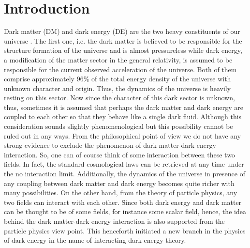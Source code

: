 \documentclass[superscriptaddress,oneolumn,secnumarabic,
amssymb,amsmath,nobibnotes,aps,prd,showpacs,nofootinbib]{revtex4}%
\begin{document}
\maketitle

\section{Introduction}



Dark matter (DM) and dark energy (DE) are the two heavy constituents of our universe \cite{Ade:2015xua}. The first one, i.e. the dark matter is believed to be responsible for the structure formation of the universe and is almost pressureless while dark energy, a modification of the matter sector in the general relativity, is assumed to be responsible for the current observed acceleration of the universe. Both of them comprise approximately 96\% of the total energy density of the universe with unknown character and origin. Thus, the dynamics of the universe is heavily resting on this sector. Now since the character of this dark sector is unknown, thus, sometimes it is assumed that perhaps the dark matter and dark energy are coupled to each other so that they behave like a single dark fluid. Although this consideration sounds slightly phenomenological but this possibility cannot be ruled out in any ways. From the philosophical point of view we do not have any strong evidence to exclude the phenomenon of dark matter-dark energy interaction. So, one can of course think of some interaction between these two fields. In fact, the standard cosmological laws can be retrieved  at any time under the no interaction limit. Additionally, the dynamics of the universe in presence of any coupling between dark matter and dark energy becomes quite richer with many possibilities. On the other hand, from the theory of particle physics, any two fields can interact with each other. Since both dark energy and dark matter can be thought to be of some fields, for instance some scalar field,
hence, the idea behind the dark matter-dark energy interaction is also supported from the particle physics view point. This henceforth initiated a new branch in the physics of dark energy in the name of interacting dark energy theory.
\end{document}
